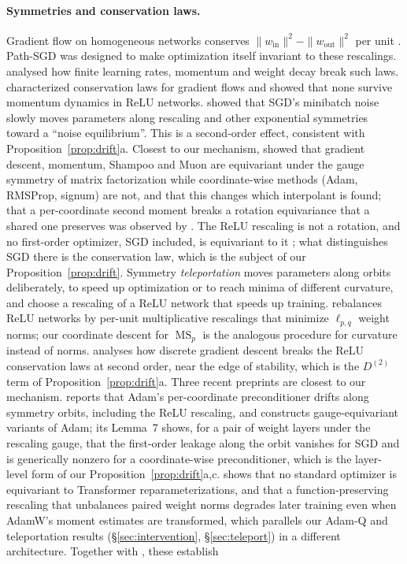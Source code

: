 \documentclass[10pt]{article}
\theoremstyle{remark}
\newcommand{\MS}{\operatorname{MS}}
\begin{document}
\paragraph{Symmetries and conservation laws.} Gradient flow on homogeneous networks conserves $\|w_{\mathrm{in}}\|^2-\|w_{\mathrm{out}}\|^2$ per unit \citep{du2018algorithmic}. Path-SGD \citep{neyshabur2015path} was designed to make optimization itself invariant to these rescalings. \citet{kunin2021neural} analysed how finite learning rates, momentum and weight decay break such laws. \citet{marcotte2023abide,marcotte2024keep} characterized conservation laws for gradient flows and showed that none survive momentum dynamics in ReLU networks. \citet{ziyin2023law,ziyin2024parameter} showed that SGD's minibatch noise slowly moves parameters along rescaling and other exponential symmetries toward a ``noise equilibrium''. This is a second-order effect, consistent with Proposition~\ref{prop:drift}a. Closest to our mechanism, \citet{singh2026loss} showed that gradient descent, momentum, Shampoo and Muon are equivariant under the gauge symmetry of matrix factorization while coordinate-wise methods (Adam, RMSProp, signum) are not, and that this changes which interpolant is found; that a per-coordinate second moment breaks a rotation equivariance that a shared one preserves was observed by \citet{ling2022vectoradam}. The ReLU rescaling is not a rotation, and no first-order optimizer, SGD included, is equivariant to it \citep{kim2026same}; what distinguishes SGD there is the conservation law, which is the subject of our Proposition~\ref{prop:drift}. Symmetry \emph{teleportation} \citep{zhao2022teleport,zhao2024improving} moves parameters along orbits deliberately, to speed up optimization or to reach minima of different curvature, and \citet{lebeurrier2026path} choose a rescaling of a ReLU network that speeds up training. \citet{saul2023weight} rebalances ReLU networks by per-unit multiplicative rescalings that minimize $\ell_{p,q}$ weight norms; our coordinate descent for $\MS_p$ is the analogous procedure for curvature instead of norms. \citet{medeiros2026conservation} analyses how discrete gradient descent breaks the ReLU conservation laws at second order, near the edge of stability, which is the $D^{(2)}$ term of Proposition~\ref{prop:drift}a. Three recent preprints are closest to our mechanism. \citet{shirodkar2026dead} reports that Adam's per-coordinate preconditioner drifts along symmetry orbits, including the ReLU rescaling, and constructs gauge-equivariant variants of Adam; its Lemma~7 shows, for a pair of weight layers under the rescaling gauge, that the first-order leakage along the orbit vanishes for SGD and is generically nonzero for a coordinate-wise preconditioner, which is the layer-level form of our Proposition~\ref{prop:drift}a,c. \citet{kim2026same} shows that no standard optimizer is equivariant to Transformer reparameterizations, and that a function-preserving rescaling that unbalances paired weight norms degrades later training even when AdamW's moment estimates are transformed, which parallels our Adam-Q and teleportation results (\S\ref{sec:intervention}, \S\ref{sec:teleport}) in a different architecture. Together with \citet{singh2026loss}, these establish 
\end{document}
